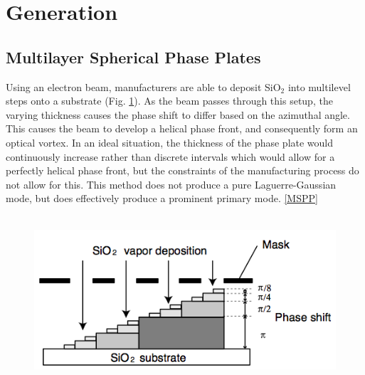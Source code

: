 \documentclass[10pt]{article}
\begin{document}
\section*{Generation}
\subsection*{Multilayer Spherical Phase Plates}
Using an electron beam, manufacturers are able to deposit SiO$_2$ into multilevel steps onto a substrate (Fig. \ref{mspp}). As the beam passes through this setup, the varying thickness causes the phase shift to differ based on the azimuthal angle. This causes the beam to develop a helical phase front, and consequently  form an optical vortex. In an ideal situation, the thickness of the phase plate would continuously increase rather than discrete intervals which would allow for a perfectly helical phase front, but the constraints of the manufacturing process do not allow for this. This method does not produce a pure Laguerre-Gaussian mode, but does effectively produce a prominent primary mode. \ref{MSPP}
\\\\

\begin{figure}
\centering
\includegraphics[scale=.5]{MSPP.jpg}
\caption{}
\label{mspp}
\end{figure}
\end{document}
